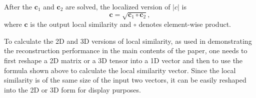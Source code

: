After the $\mathbf{c}_1$ and $\mathbf{c}_2$ are solved, the localized version of $|c|$ is
\begin{equation}
\label{eq:lsimi}
\mathbf{c} = \sqrt{\mathbf{c}_1\circ\mathbf{c}_2},
\end{equation}
where $\mathbf{c}$ is the output local similarity and $\circ$ denotes element-wise product.

To calculate the 2D and 3D versions of local similarity, as used in demonstrating the reconstruction performance in the main contents of the paper, one needs to first reshape a 2D matrix or a 3D tensor into a 1D vector and then to use the formula shown above to calculate the local similarity vector. Since the local similarity is of the same size of the input two vectors, it can be easily reshaped into the 2D or 3D form for display purposes.  





